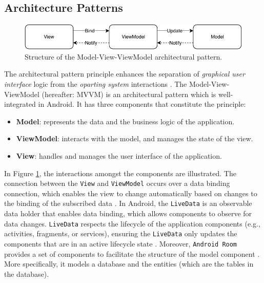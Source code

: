 \subsection{Architecture Patterns}

\begin{figure}
    \centering
    \includegraphics[scale=0.7]{images/MVVM.pdf}
    \caption{Structure of the Model-View-ViewModel architectural pattern.}
    \label{fig:mvvm}
\end{figure}

The architectural pattern principle enhances the separation of \textit{graphical user interface} logic from the \textit{oparting system} interactions \cite{architecture}. The Model-View-ViewModel (hereafter: MVVM) is an architectural pattern which is well-integrated in Android. It has three components that constitute the principle:
\begin{itemize}
    \item \textbf{Model}: represents the data and the business logic of the application. 
    \item \textbf{ViewModel}: interacts with the model, and manages the state of the view.
    \item \textbf{View}: handles and manages the user interface of the application.
\end{itemize}

In Figure \ref{fig:mvvm}, the interactions amongst the components are illustrated. The connection between the \verb|View| and \verb|ViewModel| occurs over a data binding connection, which enables the view to change automatically based on changes to the binding of the subscribed data \cite{mvvm}. In Android, the \verb|LiveData| is an observable data holder that enables data binding, which allows components to observe for data changes. \verb|LiveData| respects the lifecycle of the application components (e.g., activities, fragments, or services), ensuring the \verb|LiveData| only updates the components that are in an active lifecycle state \cite{livedata}. Moreover, \verb|Android Room| provides a set of components to facilitate the structure of the model component \cite{room}. More specifically, it models a database and the entities (which are the tables in the database).

